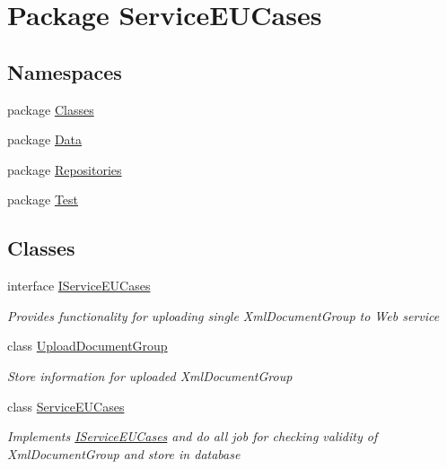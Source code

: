 \hypertarget{namespace_service_e_u_cases}{\section{Package Service\-E\-U\-Cases}
\label{namespace_service_e_u_cases}
}
\subsection*{Namespaces}
\begin{DoxyCompactItemize}
\item 
package \hyperlink{namespace_service_e_u_cases_1_1_classes}{Classes}
\item 
package \hyperlink{namespace_service_e_u_cases_1_1_data}{Data}
\item 
package \hyperlink{namespace_service_e_u_cases_1_1_repositories}{Repositories}
\item 
package \hyperlink{namespace_service_e_u_cases_1_1_test}{Test}
\end{DoxyCompactItemize}
\subsection*{Classes}
\begin{DoxyCompactItemize}
\item 
interface \hyperlink{interface_service_e_u_cases_1_1_i_service_e_u_cases}{I\-Service\-E\-U\-Cases}
\begin{DoxyCompactList}\small\item\em Provides functionality for uploading single Xml\-Document\-Group to Web service \end{DoxyCompactList}\item 
class \hyperlink{class_service_e_u_cases_1_1_upload_document_group}{Upload\-Document\-Group}
\begin{DoxyCompactList}\small\item\em Store information for uploaded Xml\-Document\-Group \end{DoxyCompactList}\item 
class \hyperlink{class_service_e_u_cases_1_1_service_e_u_cases}{Service\-E\-U\-Cases}
\begin{DoxyCompactList}\small\item\em Implements \hyperlink{interface_service_e_u_cases_1_1_i_service_e_u_cases}{I\-Service\-E\-U\-Cases} and do all job for checking validity of Xml\-Document\-Group and store in database \end{DoxyCompactList}\end{DoxyCompactItemize}
